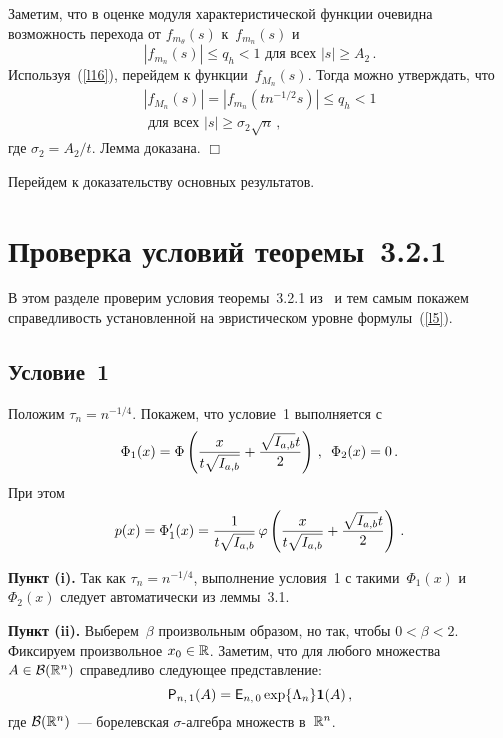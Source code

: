 \begin{multicols}{2}
Заметим, что в оценке модуля характеристической функции очевидна возможность перехода 
от $f_{m_{\theta}}(s)$ к~$f_{m_n}(s)$ и
$$
|f_{m_n}(s)| \leq q_h < 1 \mbox { для всех } |s| \geq A_2\,.
$$
Используя~(\ref{l16}), перейдем к функции~$f_{M_n}(s)$. Тогда можно утверждать, что
\begin{multline*}
|f_{M_n}(s)| = |f_{m_n}(tn^{-1/2}s)| \leq q_h < 1 \\
\mbox{ для всех } |s| \geq \sigma_2\sqrt{n}\,,
\end{multline*}
где $\sigma_2 = A_2/t$. Лемма доказана. \hfill $\Box$

Перейдем к доказательству основных результатов.

\section{Проверка условий теоремы~3.2.1}

В этом разделе проверим условия теоремы~3.2.1 из~\cite{bening} и тем самым покажем 
справедливость установленной на эвристическом уровне формулы~(\ref{l5}).

\subsection{Условие~1}

Положим $\tau_n=n^{-1/4}$. Покажем, что условие~1 выполняется с
\begin{equation*}
\Phi_1(x) = \Phi\left(\displaystyle\frac{\displaystyle x\mathstrut}{\displaystyle t\sqrt{I_{a,b}}\mathstrut} + \displaystyle\frac{\displaystyle \sqrt{I_{a,b}}t\mathstrut}{\displaystyle 2\mathstrut}\right)\,,\enskip  \Phi_2(x) = 0\,.
\end{equation*}
При этом
$$
p(x) = \Phi_1'(x) = \displaystyle\frac{\displaystyle 1\mathstrut}{\displaystyle t\sqrt{I_{a,b}}\mathstrut} \, \varphi\left(\displaystyle\frac{\displaystyle x\mathstrut}{\displaystyle t\sqrt{I_{a,b}}\mathstrut} + \displaystyle\frac{\displaystyle \sqrt{I_{a,b}}t\mathstrut}{\displaystyle 2\mathstrut}\right)\,.
$$


\noindent
\textbf{Пункт (i).} Так как $\tau_n = n^{-1/4}$, выполнение условия~1 с 
такими~$\Phi_1(x)$ и~$\Phi_2(x)$ следует автоматически из леммы~3.1.

\medskip

\noindent
\textbf{Пункт (ii).} Выберем~$\beta$ произвольным образом, но так, чтобы $0 < \beta < 2$. 
Фиксируем произвольное $x_0 \in {\mathbb{R}}$. Заметим, что для любого множества $A \in {\cal B}({\mathbb{R}}^n)$ 
справедливо следующее представление:
\begin{equation}
{{\sf P}}_{n,\,1}(A) = {{\sf E}}_{n,\,0} \exp\{\Lambda_n\} {{\bf 1}}(A)\,,
\label{l23}
\end{equation}
где ${\cal B}({\mathbb{R}}^n)$~--- борелевская $\sigma$-алгебра множеств в~${\mathbb{R}}^n$.


\end{multicols}
